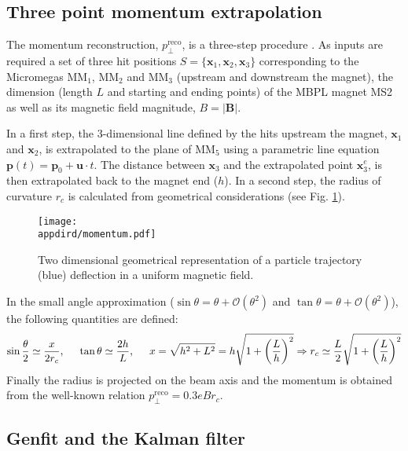 \subsection{Three point momentum extrapolation}
\label{appD:sec:mom-reco-simple}

The momentum reconstruction, $p_\perp^\text{reco}$, is a three-step procedure \cite{na64-muon-note}. As inputs are required a set of three hit positions $S=\{\mathbf{x}_1,\mathbf{x}_2,\mathbf{x}_3\}$ corresponding to the Micromegas MM$_1$, MM$_2$ and MM$_3$ (upstream and downstream the magnet), the dimension (length $L$ and starting and ending points) of the MBPL magnet MS2 as well as its magnetic field magnitude, $B=|\mathbf{B}|$.

In a first step, the 3-dimensional line defined by the hits upstream the magnet, $\mathbf{x}_1$ and $\mathbf{x}_2$, is extrapolated to the plane of MM$_5$ using a parametric line equation $\mathbf{p}(t)=\mathbf{p}_0+\mathbf{u}\cdot t$. The distance between $\mathbf{x}_3$ and the extrapolated point $\mathbf{x}_3^{e}$, is then extrapolated back to the magnet end ($h$). In a second step, the radius of curvature $r_c$ is calculated from geometrical considerations (see Fig. \ref{fig:momentumgeo}).
\begin{figure}[tbh!]
    \centering
    \texttt{[image: \\appdird/momentum.pdf]}
    \caption{Two dimensional geometrical representation of a particle trajectory (blue) deflection in a uniform magnetic field.}
    \label{fig:momentumgeo}
\end{figure}
In the small angle approximation ($\sin\theta=\theta+\mathcal{O}(\theta^2)$ and $\tan\theta=\theta+\mathcal{O}(\theta^2)$), the following quantities are defined:
\begin{equation}
  \label{eq:mom-simple}
        \sin\frac{\theta}{2}\simeq\frac{x}{2r_c},\hspace{5mm}
        \tan\theta\simeq\frac{2h}{L},\hspace{5mm}x=\sqrt{h^2+L^2}=h\sqrt{1+\left(\frac{L}{h}\right)^2}\Rightarrow r_c\simeq\frac{L}{2}\sqrt{1+\left(\frac{L}{h}\right)^2}
\end{equation}
Finally the radius is projected on the beam axis and the momentum is obtained from the well-known relation $p_\perp^\text{reco}=0.3eBr_c$. 
\subsection{Genfit and the Kalman filter}
\label{appD:sec:kalman-filter}

